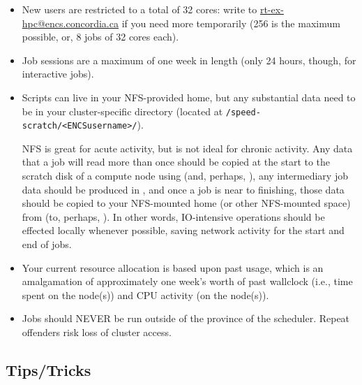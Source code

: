 \documentclass{easychair}
\begin{document}
\begin{itemize}
\item
New users are restricted to a total of 32 cores: write to \url{rt-ex-hpc@encs.concordia.ca}
if you need more temporarily (256 is the maximum possible, or, 8 jobs of 32 cores each).

\item
Job sessions are a maximum of one week in length (only 24 hours, though,
for interactive jobs).

\item
Scripts can live in your NFS-provided home, but any substantial data need
to be in your cluster-specific directory
(located at \verb+/speed-scratch/<ENCSusername>/+).

NFS is great for acute activity, but is not ideal for chronic activity.
Any data that a job will 
read more than once should be copied at the start to the scratch disk of a 
compute node using  (and, perhaps, ), 
any intermediary job data should be produced in , and once a 
job is near to finishing, those data should be copied to your NFS-mounted 
home (or other NFS-mounted space) from  (to, perhaps,
). In other words, IO-intensive operations should be effected 
locally whenever possible, saving network activity for the start and end of 
jobs. 

\item
Your current resource allocation is based upon past usage, which is an 
amalgamation of approximately one week's worth of past wallclock (i.e., time 
spent on the node(s)) and CPU activity (on the node(s)).

\item
Jobs should NEVER be run outside of the province of the scheduler. Repeat 
offenders risk loss of cluster access. 

\end{itemize}

\subsection{Tips/Tricks}
\label{sect:tips}
\end{document}
